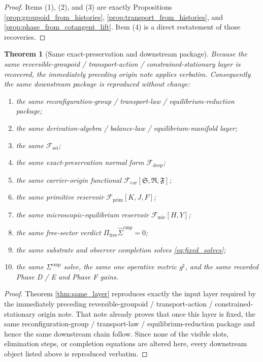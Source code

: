 \documentclass[11pt]{article}
\newcommand{\CompletedMetric}{g^{\sharp}}
\newcommand{\CompLift}{\widehat\Sigma^{\mathrm{cmp}}}
\newcommand{\FreeProj}{\Pi_{\mathrm{free}}}
\newcommand{\GaugeAux}{Y}
\newcommand{\MicFunctional}{\mathscr F_{\mathrm{mic}}}
\newcommand{\PrimFunctional}{\mathscr F_{\mathrm{prim}}}
\newcommand{\CarrierFunctional}{\mathscr F_{\mathrm{car}}}
\newcommand{\DeepFunctional}{\mathscr F_{\mathrm{deep}}}
\newcommand{\StemFunctional}{\mathscr F_{\mathrm{sel}}}
\newcommand{\PrimStrain}{K}
\newcommand{\PrimNeutral}{J}
\newcommand{\PrimFree}{F}
\newcommand{\CarrierSeed}{\mathfrak S}
\newcommand{\RelabelSeed}{\mathfrak R}
\newcommand{\FreeSeed}{\mathfrak F}
\newtheorem{theorem}{Theorem}
\begin{document}
\begin{proof}
Items (1), (2), and (3) are exactly Propositions \ref{prop:groupoid_from_histories}, \ref{prop:transport_from_histories}, and \ref{prop:phase_from_cotangent_lift}. Item (4) is a direct restatement of those recoveries.
\end{proof}

\begin{theorem}[Same exact-preservation and downstream package]
\label{thm:same_package}
Because the same reversible-groupoid / transport-action / constrained-stationary layer is recovered, the immediately preceding origin note applies verbatim. Consequently the same downstream package is reproduced without change:
\begin{enumerate}
    \item the same reconfiguration-group / transport-law / equilibrium-reduction package;
    \item the same derivation-algebra / balance-law / equilibrium-manifold layer;
    \item the same \(\StemFunctional\);
    \item the same exact-preservation normal form \(\DeepFunctional\);
    \item the same carrier-origin functional \(\CarrierFunctional[\CarrierSeed,\RelabelSeed,\FreeSeed]\);
    \item the same primitive reservoir \(\PrimFunctional[\PrimStrain,\PrimNeutral,\PrimFree]\);
    \item the same microscopic-equilibrium reservoir \(\MicFunctional[H,\GaugeAux]\);
    \item the same free-sector verdict \(\FreeProj\CompLift=0\);
    \item the same substrate and observer completion solves \eqref{eq:fixed_solves};
    \item the same \(\Sigma^{\mathrm{cmp}}\) solve, the same one operative metric \(\CompletedMetric\), and the same recorded Phase D / E and Phase F gains.
\end{enumerate}
\end{theorem}

\begin{proof}
Theorem \ref{thm:same_layer} reproduces exactly the input layer required by the immediately preceding reversible-groupoid / transport-action / constrained-stationary origin note. That note already proves that once this layer is fixed, the same reconfiguration-group / transport-law / equilibrium-reduction package and hence the same downstream chain follow. Since none of the visible slots, elimination steps, or completion equations are altered here, every downstream object listed above is reproduced verbatim.
\end{proof}
\end{document}
